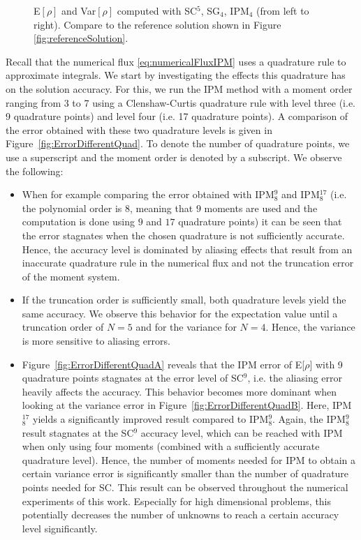 \begin{figure}[h!]
\begin{subfigure}{0.3\linewidth}
		\label{fig:sub1}
	\end{subfigure}
	\caption{E$[\rho]$ and Var$[\rho]$ computed with SC$^5$, SG$_4$, IPM$_4$ (from left to right). Compare to the reference solution shown in Figure \ref{fig:referenceSolution}.}
	\label{fig:ERhoVarRho5}
\end{figure}

Recall that the numerical flux \eqref{eq:numericalFluxIPM} uses a quadrature rule to approximate integrals. We start by investigating the effects this quadrature has on the solution accuracy. For this, we run the IPM method with a moment order ranging from 3 to 7 using a Clenshaw-Curtis quadrature rule with level three (i.e. 9 quadrature points) and level four (i.e. 17 quadrature points). A comparison of the error obtained with these two quadrature levels is given in Figure~\ref{fig:ErrorDifferentQuad}. To denote the number of quadrature points, we use a superscript and the moment order is denoted by a subscript. We observe the following:
\begin{itemize}
\item When for example comparing the error obtained with IPM$_8^9$ and IPM$_8^{17}$ (i.e. the polynomial order is $8$, meaning that $9$ moments are used and the computation is done using $9$ and $17$ quadrature points) it can be seen that the error stagnates when the chosen quadrature is not sufficiently accurate. Hence, the accuracy level is dominated by aliasing effects that result from an inaccurate quadrature rule in the numerical flux and not the truncation error of the moment system.
\item If the truncation order is sufficiently small, both quadrature levels yield the same accuracy. We observe this behavior for the expectation value until a truncation order of $N=5$ and for the variance for $N=4$. Hence, the variance is more sensitive to aliasing errors.
\item Figure~\ref{fig:ErrorDifferentQuadA} reveals that the IPM error of E[$\rho$] with 9 quadrature points stagnates at the error level of SC$^9$, i.e. the aliasing error heavily affects the accuracy. This behavior becomes more dominant when looking at the variance error in Figure~\ref{fig:ErrorDifferentQuadB}. Here, IPM$_8^{17}$ yields a significantly improved result compared to IPM$_8^9$. Again, the IPM$_8^9$ result stagnates at the SC$^9$ accuracy level, which can be reached with IPM when only using four moments (combined with a sufficiently accurate quadrature level). Hence, the number of moments needed for IPM to obtain a certain variance error is significantly smaller than the number of quadrature points needed for SC. This result can be observed throughout the numerical experiments of this work. Especially for high dimensional problems, this potentially decreases the number of unknowns to reach a certain accuracy level significantly. %
\end{itemize}

